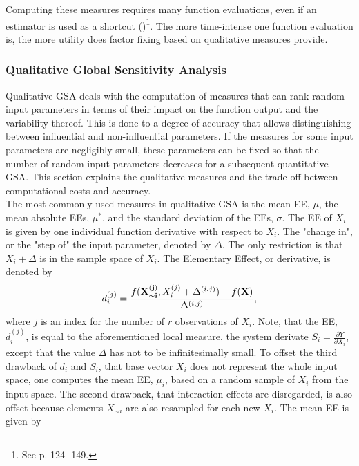 \noindent
Computing these measures requires many function evaluations, even if an estimator is used as a shortcut (\cite{Saltelli.2004})\footnote{See p. 124 -149.}. The more time-intense one function evaluation is, the more utility does factor fixing based on qualitative measures provide. 


\subsubsection{Qualitative Global Sensitivity Analysis}


Qualitative GSA deals with the computation of measures that can rank random input parameters in terms of their impact on the function output and the variability thereof. This is done to a degree of accuracy that allows distinguishing between influential and non-influential parameters. If the measures for some input parameters are negligibly small, these parameters can be fixed so that the number of random input parameters decreases for a subsequent quantitative GSA. This section explains the qualitative measures and the trade-off between computational costs and accuracy. \\

\noindent
The most commonly used measures in qualitative GSA is the mean EE, $\mu$, the mean absolute EEs, $\mu^*$, and the standard deviation of the EEs, $\sigma$. The EE of $X_i$ is given by one individual function derivative with respect to $X_i$. The "change in", or the "step of" the input parameter, denoted by $\Delta$. The only restriction is that $X_i + \Delta$ is in the sample space of $X_i$. The Elementary Effect, or derivative, is denoted by
\begin{align} \label{eq:EE}
d_i^{(j)} =  \frac{f(\bold{X_{\sim i}^{(j)}}, X_i^{(j)} + \Delta^{(i,j)})- f(\bold{X})}{\Delta^{(i,j)}},
\end{align}
where $j$ is an index for the number of $r$ observations of $X_i$.
Note, that the EE, $d_i^{(j)}$, is equal to the aforementioned local measure, the system derivate $S_i = \frac{\partial Y}{\partial X_i}$, except that the value $\Delta$ has not to be infinitesimally small. To offset the third drawback of $d_i$ and $S_i$, that base vector $X_i$ does not represent the whole input space, one computes the mean EE, $\mu_i$, based on a random sample of $X_i$ from the input space. The second drawback, that interaction effects are disregarded, is also offset because elements $X_{\sim i}$ are also resampled for each new $X_i$. The mean EE is given by

